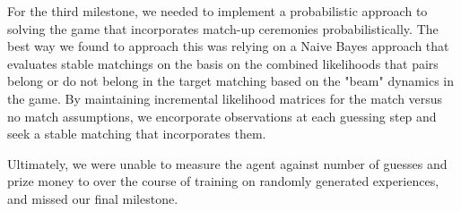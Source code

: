 \documentclass{article}
\begin{document}
For the third milestone, we needed to implement a probabilistic approach to
solving the game that incorporates match-up ceremonies probabilistically.
The best way we found to approach this was relying on a Naive Bayes approach
that evaluates stable matchings on the basis on the combined likelihoods
that pairs belong or do not belong in the target matching based on the
"beam" dynamics in the game. By maintaining incremental likelihood matrices
for the match versus no match assumptions, we encorporate observations at
each guessing step and seek a stable matching that incorporates them.

Ultimately, we were unable to measure the agent against number of guesses
and prize money to over the course of training on randomly generated
experiences, and missed our final milestone.
\end{document}
